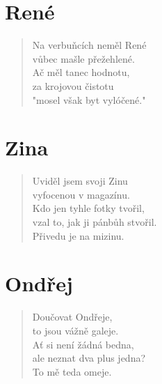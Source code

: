 \section*{René}
\begin{verse}
Na verbuňcích neměl René\\
vůbec mašle přežehlené.\\
Ač měl tanec hodnotu,\\
za krojovou čistotu\\
"mosel však byt vylóčené."
\end{verse}

\section*{Zina}
\begin{verse}
Uviděl jsem svoji Zinu\\
vyfocenou v magazínu.\\
Kdo jen tyhle fotky tvořil,\\
vzal to, jak ji pánbůh stvořil.\\
Přivedu je na mizinu.
\end{verse}

\section*{Ondřej}
\begin{verse}
Doučovat Ondřeje,\\
to jsou vážně galeje.\\
Ať si není žádná bedna,\\
ale neznat dva plus jedna?\\
To mě teda omeje.
\end{verse}

